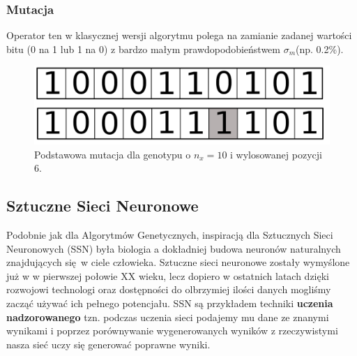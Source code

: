 \documentclass{article}
\begin{document}
\subsubsection{Mutacja}
Operator ten w klasycznej wersji algorytmu polega na zamianie zadanej wartości bitu
(0 na 1 lub 1 na 0) z bardzo małym  prawdopodobieństwem $\sigma_m$(np. 0.2\%).
\begin{figure}[H]
\centering
\includegraphics[scale=0.2]{mutation_v2.png}
\caption{Podstawowa mutacja dla genotypu o $n_x = 10$ i wylosowanej pozycji 6.}
\end{figure}



\subsection{Sztuczne Sieci Neuronowe}
\label{sec:ssn}
Podobnie jak dla Algorytmów Genetycznych, inspiracją dla Sztucznych Sieci Neuronowych (SSN) 
była biologia a dokładniej budowa neuronów naturalnych znajdujących się w ciele człowieka.
Sztuczne sieci neuronowe zostały wymyślone już w w pierwszej połowie XX wieku, lecz dopiero w ostatnich latach
dzięki rozwojowi technologi oraz dostępności do olbrzymiej ilości danych mogliśmy zacząć używać
ich pełnego potencjału. SSN są przykładem techniki \textbf{uczenia nadzorowanego} tzn.
podczas uczenia sieci podajemy mu dane ze znanymi wynikami i poprzez porównywanie wygenerowanych
wyników z rzeczywistymi nasza sieć uczy się generować poprawne wyniki.
\end{document}
